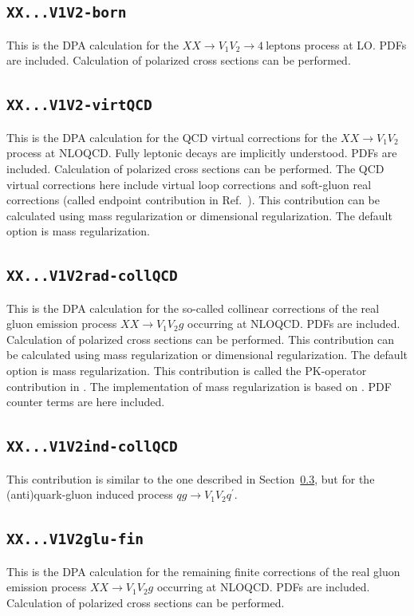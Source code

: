 \documentclass[english,12pt]{article}
\newcommand{\sect}[1]{Section~\ref{#1}}
\newcommand{\bib}[1]{Ref.~\cite{#1}}
\begin{document}
\subsection{\tt XX...V1V2-born}
\label{sec:DPA-born}
This is the DPA calculation for the $XX \to V_1 V_2 \to 4\ \text{leptons}$ process at LO. 
PDFs are included. Calculation of polarized cross sections can be performed.   
\subsection{\tt XX...V1V2-virtQCD}
\label{sec:virtQCD}
This is the DPA calculation for the QCD virtual corrections for the $XX \to V_1 V_2$ process at NLOQCD. 
Fully leptonic decays are implicitly understood. 
PDFs are included. Calculation of polarized cross sections can be performed. 
The QCD virtual corrections here include virtual loop corrections and soft-gluon real corrections 
(called endpoint contribution in \bib{Dittmaier:1999mb}). 
This contribution can be calculated using mass regularization or dimensional regularization. 
The default option is mass regularization.
\subsection{\tt XX...V1V2rad-collQCD}
\label{sec:rad-collQCD}
This is the DPA calculation for the so-called collinear corrections of the real gluon emission process 
$XX \to V_1 V_2 g$ occurring at NLOQCD. PDFs are included. 
Calculation of polarized cross sections can be performed. 
This contribution can be calculated using mass regularization or dimensional regularization. 
The default option is mass regularization.
This contribution is called the PK-operator contribution in \cite{Catani:1996vz}. 
The implementation of mass regularization is based on \cite{Dittmaier:1999mb}. 
PDF counter terms are here included. 
\subsection{\tt XX...V1V2ind-collQCD}
\label{sec:ind-collQCD}
This contribution is similar to the one described in \sect{sec:rad-collQCD}, but for the 
(anti)quark-gluon induced process $qg \to V_1 V_2 q^\prime$. 
\subsection{\tt XX...V1V2glu-fin}
\label{sec:glu-rad-fin}
This is the DPA calculation for the remaining finite corrections of the real gluon emission process 
$XX \to V_1 V_2 g$ occurring at NLOQCD. PDFs are included. 
Calculation of polarized cross sections can be performed. 
\end{document}

